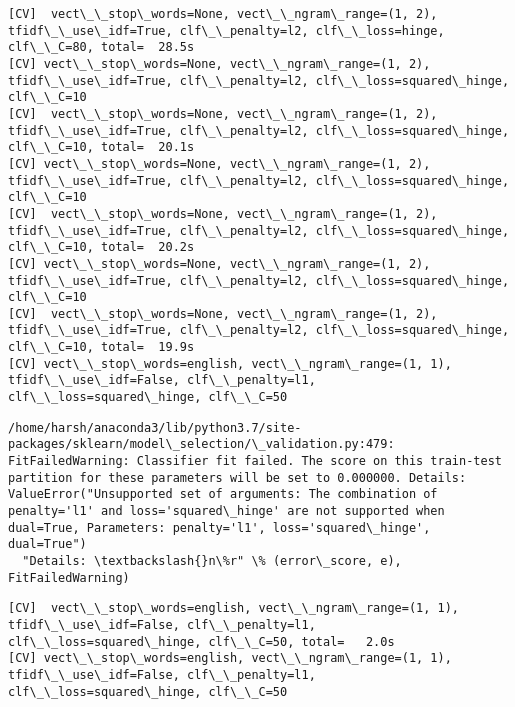 \documentclass[11pt]{article}
\begin{document}
\begin{Verbatim}[commandchars=\\\{\}]
[CV]  vect\_\_stop\_words=None, vect\_\_ngram\_range=(1, 2), tfidf\_\_use\_idf=True, clf\_\_penalty=l2, clf\_\_loss=hinge, clf\_\_C=80, total=  28.5s
[CV] vect\_\_stop\_words=None, vect\_\_ngram\_range=(1, 2), tfidf\_\_use\_idf=True, clf\_\_penalty=l2, clf\_\_loss=squared\_hinge, clf\_\_C=10 
[CV]  vect\_\_stop\_words=None, vect\_\_ngram\_range=(1, 2), tfidf\_\_use\_idf=True, clf\_\_penalty=l2, clf\_\_loss=squared\_hinge, clf\_\_C=10, total=  20.1s
[CV] vect\_\_stop\_words=None, vect\_\_ngram\_range=(1, 2), tfidf\_\_use\_idf=True, clf\_\_penalty=l2, clf\_\_loss=squared\_hinge, clf\_\_C=10 
[CV]  vect\_\_stop\_words=None, vect\_\_ngram\_range=(1, 2), tfidf\_\_use\_idf=True, clf\_\_penalty=l2, clf\_\_loss=squared\_hinge, clf\_\_C=10, total=  20.2s
[CV] vect\_\_stop\_words=None, vect\_\_ngram\_range=(1, 2), tfidf\_\_use\_idf=True, clf\_\_penalty=l2, clf\_\_loss=squared\_hinge, clf\_\_C=10 
[CV]  vect\_\_stop\_words=None, vect\_\_ngram\_range=(1, 2), tfidf\_\_use\_idf=True, clf\_\_penalty=l2, clf\_\_loss=squared\_hinge, clf\_\_C=10, total=  19.9s
[CV] vect\_\_stop\_words=english, vect\_\_ngram\_range=(1, 1), tfidf\_\_use\_idf=False, clf\_\_penalty=l1, clf\_\_loss=squared\_hinge, clf\_\_C=50 

    \end{Verbatim}

    \begin{Verbatim}[commandchars=\\\{\}]
/home/harsh/anaconda3/lib/python3.7/site-packages/sklearn/model\_selection/\_validation.py:479: FitFailedWarning: Classifier fit failed. The score on this train-test partition for these parameters will be set to 0.000000. Details: 
ValueError("Unsupported set of arguments: The combination of penalty='l1' and loss='squared\_hinge' are not supported when dual=True, Parameters: penalty='l1', loss='squared\_hinge', dual=True")
  "Details: \textbackslash{}n\%r" \% (error\_score, e), FitFailedWarning)

    \end{Verbatim}

    \begin{Verbatim}[commandchars=\\\{\}]
[CV]  vect\_\_stop\_words=english, vect\_\_ngram\_range=(1, 1), tfidf\_\_use\_idf=False, clf\_\_penalty=l1, clf\_\_loss=squared\_hinge, clf\_\_C=50, total=   2.0s
[CV] vect\_\_stop\_words=english, vect\_\_ngram\_range=(1, 1), tfidf\_\_use\_idf=False, clf\_\_penalty=l1, clf\_\_loss=squared\_hinge, clf\_\_C=50 

    \end{Verbatim}
\end{document}
